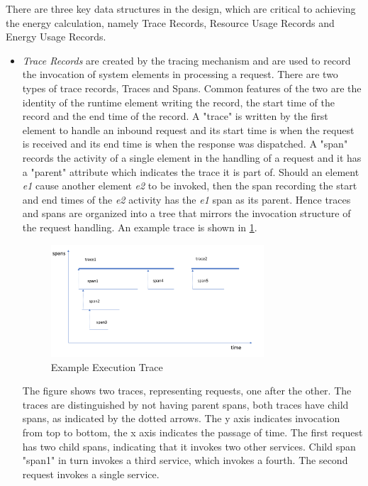 There are three key data structures in the design, which are critical to achieving the energy calculation, namely Trace Records, Resource Usage Records and Energy Usage Records.

\begin{itemize}

\item \emph{Trace Records} are created by the tracing mechanism and are used to record the invocation of system elements in processing a request.  There are two types of trace records, Traces and Spans.  Common features of the two are the identity of the runtime element writing the record, the start time of the record and the end time of the record.  A "trace" is written by the first element to handle an inbound request and its start time is when the request is received and its end time is when the response was dispatched.  A "span" records the activity of a single element in the handling of a request and it has a "parent" attribute which indicates the trace it is part of.  Should an element \emph{e1} cause another element \emph{e2} to be invoked, then the span recording the start and end times of the \emph{e2} activity has the \emph{e1} span as its parent.  Hence traces and spans are organized into a tree that mirrors the invocation structure of the request handling.  An example trace is shown in \ref{figure:span}.

\begin{figure}
\centering
\includegraphics[width=0.75\textwidth]{Figures/estimating-energy-trace}
\caption{Example Execution Trace}
\label{figure:span}
\end{figure}

The figure shows two traces, representing requests, one after the other.  The traces are distinguished by not having parent spans, both traces have child spans, as indicated by the dotted arrows.  The y axis indicates invocation from top to bottom, the x axis indicates the passage of time.  The first request has two child spans, indicating that it invokes two other services.  Child span "span1" in turn invokes a third service, which invokes a fourth.  The second request invokes a single service.


\end{itemize}
